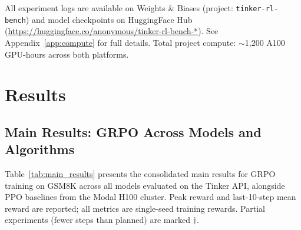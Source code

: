\documentclass{article}
\begin{document}
All experiment logs are available on Weights \& Biases (project: \texttt{tinker-rl-bench}) and model checkpoints on HuggingFace
Hub (\url{https://huggingface.co/anonymous/tinker-rl-bench-*}).
See Appendix~\ref{app:compute} for full details. Total project compute:
$\sim$1,200 A100 GPU-hours across both platforms.

\section{Results}
\label{sec:results}

\subsection{Main Results: GRPO Across Models and Algorithms}
\label{sec:main_results}

Table~\ref{tab:main_results} presents the consolidated main results for GRPO
training on GSM8K across all models evaluated on the Tinker API, alongside
PPO baselines from the Modal H100 cluster. Peak reward and last-10-step mean
reward are reported; all metrics are single-seed training rewards.
Partial experiments (fewer steps than planned) are marked $\dagger$.
\end{document}
